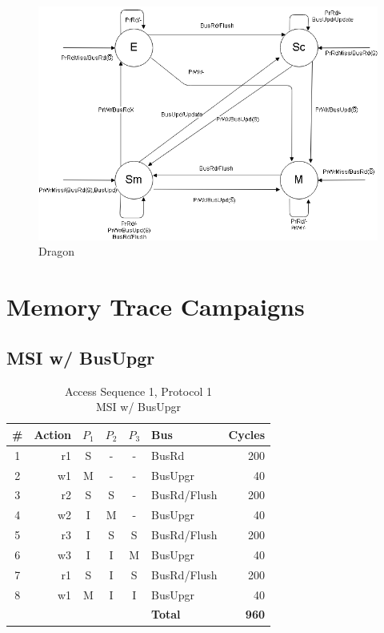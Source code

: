 \documentclass[12pt, letterpaper]{report}
\begin{document}
\begin{figure}[H]
	\centering
	\includegraphics[width=0.6\columnwidth]{dragon.png}
	\caption{Dragon}
\end{figure}

\section{Memory Trace Campaigns}

\subsection{MSI w/ BusUpgr}

\begin{table}[H]
	\centering
	\begin{tabular}{ |c|r|c|c|c|l|r| }
		\hline
		\textbf{\#} & \textbf{Action} & \textbf{$P_1$} & \textbf{$P_{2}$} & \textbf{$P_3$} & \textbf{Bus} & \textbf{Cycles} \\
		\hline
		1 & r1 & S & - & - & BusRd & 200 \\
		\hline
		2 & w1 & M & - & - & BusUpgr & 40 \\
		\hline
		3 & r2 & S & S & - & BusRd/Flush & 200 \\
		\hline
		4 & w2 & I & M & - & BusUpgr & 40 \\
		\hline
		5 & r3 & I & S & S & BusRd/Flush & 200 \\
		\hline
		6 & w3 & I & I & M & BusUpgr & 40 \\
		\hline
		7 & r1 & S & I & S & BusRd/Flush & 200  \\
		\hline
		8 & w1 & M & I & I & BusUpgr & 40 \\
		\hline \hline \hline
		\cellcolor{null} & \cellcolor{null} & \cellcolor{null} & \cellcolor{null} & \cellcolor{null} & \textbf{Total} & \textbf{960} \\
		\hline
\end{tabular}
\caption{Access Sequence 1, Protocol 1\\MSI w/ BusUpgr}
\end{table}
\end{document}
